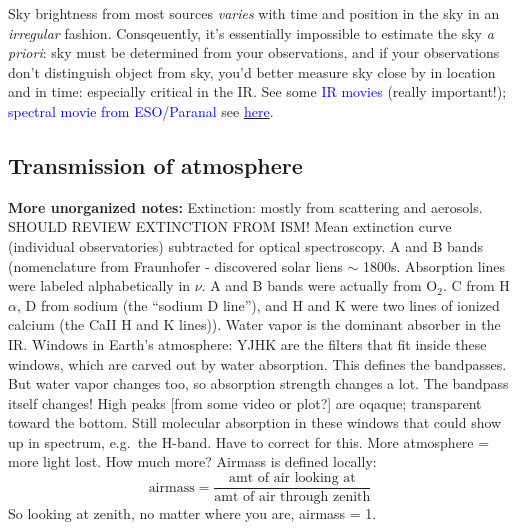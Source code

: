 \documentclass[12pt]{article}
\begin{document}
Sky brightness from most sources \emph{varies} with time and position in the
sky in an \emph{irregular} fashion. Consqeuently, it's essentially impossible
to estimate the sky \emph{a priori}: sky must be determined from your
observations, and if your observations don't distinguish object from
sky, you'd better measure sky close by in location and in time:
especially critical in the IR\@. See some
{\textcolor{blue}{IR movies}} (really important!);
{\textcolor{blue}{spectral movie from ESO/Paranal}} see
\href{https://www.astro.uni-bonn.de/theli/gui/aboutbackground.html}
{\textcolor{blue}{here}}.

\subsection*{Transmission of atmosphere}

\textcolor{myBlue}{\textbf{More unorganized notes:}
    Extinction: mostly from scattering and aerosols. SHOULD REVIEW
    EXTINCTION FROM ISM\@! Mean extinction curve (individual observatories)
    subtracted for optical spectroscopy. A and B bands (nomenclature
    from Fraunhofer - discovered solar liens $\sim$ 1800s.
    Absorption lines were labeled alphabetically in $\nu$. A and B bands
    were actually from O$_2$. C from H$\alpha$, D from sodium (the
    ``sodium D line''), and H and K were two lines of ionized calcium
    (the CaII H and K lines)).
    Water vapor is the dominant absorber in the IR\@.
    Windows in Earth's atmosphere: YJHK are the filters that fit inside
    these windows, which are carved out by water absorption.
    This defines the bandpasses. But water vapor changes too,
    so absorption strength changes a lot. The bandpass itself
    changes! High peaks [from some video or plot?] are oqaque;
    transparent toward the bottom. Still molecular absorption in
    these windows that could show up in spectrum, e.g.\ the H-band.
    Have to correct for this. More atmosphere = more light lost.
    How much more? Airmass is defined locally:
    $$ \textrm{airmass} = \frac{\textrm{amt\ of air\ looking\ at}}
        {\textrm{amt\ of\ air\ through\ zenith}}$$
    So looking at zenith, no matter where you are, airmass = 1.
}
\end{document}
